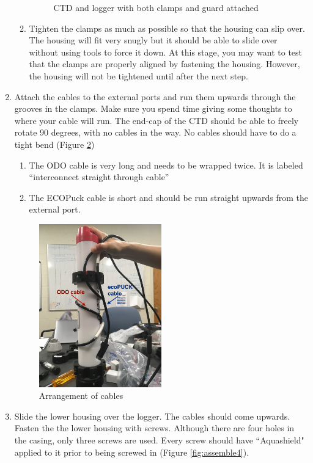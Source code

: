 \documentclass[13pt]{article}
\begin{document}
\begin{enumerate}
\begin{enumerate}
\begin{figure}
    \caption{CTD and logger with both clamps and guard attached}
    \label{fig:assemble2}
\end{figure}
        \item Tighten the clamps as much as possible so that the housing can slip over. The housing will fit very snugly but it should be able to slide over without using tools to force it down. At this stage, you may want to test that the clamps are properly aligned by fastening the housing. However, the housing will not be tightened until after the next step.
    \end{enumerate}
    \item Attach the cables to the external ports and run them upwards through the grooves in the clamps. Make sure you spend time giving some thoughts to where your cable will run. The end-cap of the CTD should be able to freely rotate 90 degrees, with no cables in the way. No cables should have to do a tight bend (Figure \ref{fig:assemble3})
    \begin{enumerate}
        \item The ODO cable is very long and needs to be wrapped twice. It is labeled ``interconnect straight through cable''
        \item The ECOPuck cable is short and should be run straight upwards from the external port. 
    \end{enumerate}
    \begin{figure}
        \centering
        \includegraphics[width = 0.5\textwidth]{IMG_1642.JPG}
        \caption{Arrangement of cables}
        \label{fig:assemble3}
    \end{figure}
    \item Slide the lower housing over the logger. The cables should come upwards. Fasten the the lower housing with screws. Although there are four holes in the casing, only three screws are used. Every screw should have ``Aquashield" applied to it prior to being screwed in (Figure \ref{fig:assemble4}).

\end{enumerate}
\end{document}
